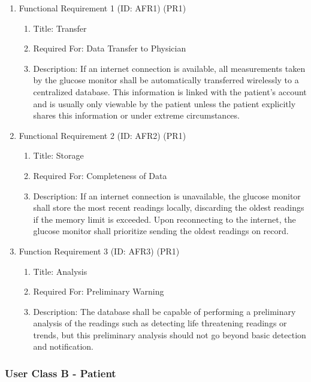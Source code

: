 \documentclass[12pt]{article}
\begin{document}
\begin{enumerate}
    \item Functional Requirement 1 (ID: AFR1) (PR1)
    \begin{enumerate}
        \item Title: Transfer
        \item Required For: Data Transfer to Physician
        \item Description: If an internet connection is available, all measurements taken by the glucose monitor
        shall be automatically transferred wirelessly to a centralized database. This information is linked with
        the patient’s account and is usually only viewable by the patient unless the patient explicitly shares
        this information or under extreme circumstances.
    \end{enumerate}
    \item Functional Requirement 2 (ID: AFR2) (PR1)
    \begin{enumerate}
        \item Title: Storage
        \item Required For: Completeness of Data
        \item Description: If an internet connection is unavailable, the glucose monitor shall store the most recent
        readings locally, discarding the oldest readings if the memory limit is exceeded. Upon reconnecting to the
        internet, the glucose monitor shall prioritize sending the oldest readings on record.
    \end{enumerate}
    \item Function Requirement 3 (ID: AFR3) (PR1)
    \begin{enumerate}
        \item Title: Analysis
        \item Required For: Preliminary Warning
        \item Description: The database shall be capable of performing a preliminary analysis of the readings such
        as detecting life threatening readings or trends, but this preliminary analysis should not go beyond basic
        detection and notification.
    \end{enumerate}
\end{enumerate}

\subsubsection{User Class B - Patient}
\end{document}
